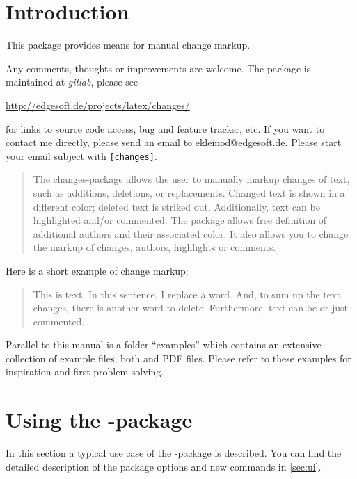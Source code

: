\section{Introduction}

This package provides means for manual change markup.

Any comments, thoughts or improvements are welcome.
The package is maintained at \emph{gitlab}, please see

\url{http://edgesoft.de/projects/latex/changes/}

for links to source code access, bug and feature tracker, etc.
If you want to contact me directly, please send an email to \href{mailto:ekleinod@edgesoft.de}{ekleinod@edgesoft.de}.
Please start your email subject with \texttt{[changes]}.

\begin{quote}
	The changes-package allows the user to manually markup changes of text, such as additions, deletions, or replacements.
	Changed text is shown in a different color; deleted text is striked out.
	Additionally, text can be highlighted and/or commented.
	The package allows free definition of additional authors and their associated color.
	It also allows you to change the markup of changes, authors, highlights or comments.
\end{quote}

Here is a short example of change markup:

\begin{quote}
	This is  text.
	In this sentence, I replace a  word.
	And, to sum up the text changes, there is another  word to delete.
	Furthermore, text can be  or just commented.
\end{quote}

Parallel to this manual is a folder ``examples'' which contains an extensive collection of example files, both  and PDF files.
Please refer to these examples for inspiration and first problem solving.


\cleardoublepage
\section{Using the -package}
\label{sec:usage}

In this section a typical use case of the -package is described.
You can find the detailed description of the package options and new commands in \autoref{sec:ui}.

